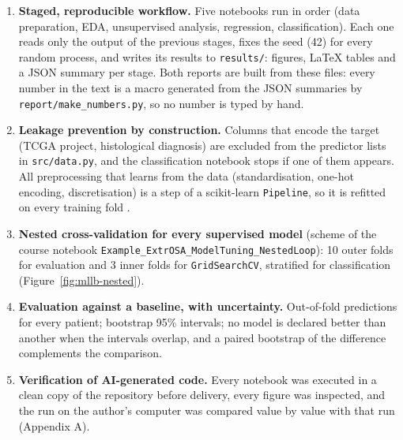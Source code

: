 \begin{enumerate}
  \item \textbf{Staged, reproducible workflow.} Five notebooks run in order (data preparation, EDA,
        unsupervised analysis, regression, classification). Each one reads only the output of the
        previous stages, fixes the seed (42) for every random process, and writes its results to
        \texttt{results/}: figures, \LaTeX{} tables and a JSON summary per stage. Both reports are built
        from these files: every number in the text is a macro generated from the JSON summaries by
        \texttt{report/\allowbreak{}make\_\allowbreak{}numbers.\allowbreak{}py}, so no number is typed by hand.
  \item \textbf{Leakage prevention by construction.} Columns that encode the target (TCGA project,
        histological diagnosis) are excluded from the predictor lists in \texttt{src/data.py}, and the
        classification notebook stops if one of them appears. All preprocessing that learns from the
        data (standardisation, one-hot encoding, discretisation) is a step of a scikit-learn
        \texttt{Pipeline}, so it is refitted on every training fold \cite{kaufman2012}.
  \item \textbf{Nested cross-validation for every supervised model} (scheme of the course notebook
        \texttt{Example\_\allowbreak{}ExtrOSA\_\allowbreak{}ModelTuning\_\allowbreak{}NestedLoop}): 10 outer folds for evaluation and 3 inner
        folds for \texttt{GridSearchCV}, stratified for classification
        (Figure~\ref{fig:mllb-nested}).
  \item \textbf{Evaluation against a baseline, with uncertainty.} Out-of-fold predictions for every
        patient; bootstrap 95\% intervals; no model is declared better than another when the intervals
        overlap, and a paired bootstrap of the difference complements the comparison.
  \item \textbf{Verification of AI-generated code.} Every notebook was executed in a clean copy of
        the repository before delivery, every figure was inspected, and the run on the author's
        computer was compared value by value with that run (Appendix A).
\end{enumerate}

